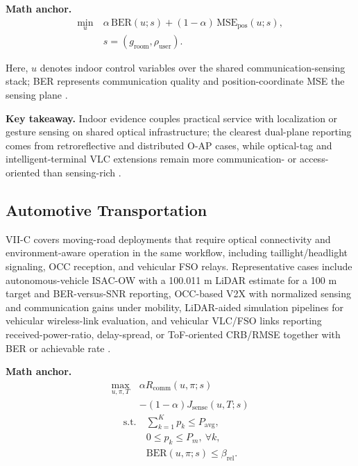 \textbf{Math anchor.}
\begin{equation}
    \begin{split}
        \min_{u}\  & \alpha\,\mathrm{BER}(u;s) + (1-\alpha)\,\mathrm{MSE}_{\mathrm{pos}}(u;s), \\
                   & s=(g_{\mathrm{room}},\rho_{\mathrm{user}}).
    \end{split}
\end{equation}

Here, $u$ denotes indoor control variables over the shared communication-sensing stack; BER represents communication quality and position-coordinate MSE the sensing plane \cite{O_ISAC_108,O_ISAC_388}.

\textbf{Key takeaway.} Indoor evidence couples practical service with localization or gesture sensing on shared optical infrastructure; the clearest dual-plane reporting comes from retroreflective and distributed O-AP cases, while optical-tag and intelligent-terminal VLC extensions remain more communication- or access-oriented than sensing-rich \cite{O_ISAC_291,O_ISAC_386}.

\subsection{Automotive Transportation}

VII-C covers moving-road deployments that require optical connectivity and environment-aware operation in the same workflow, including taillight/headlight signaling, OCC reception, and vehicular FSO relays. Representative cases include autonomous-vehicle ISAC-OW with a 100.011 m LiDAR estimate for a 100 m target and BER-versus-SNR reporting, OCC-based V2X with normalized sensing and communication gains under mobility, LiDAR-aided simulation pipelines for vehicular wireless-link evaluation, and vehicular VLC/FSO links reporting received-power-ratio, delay-spread, or ToF-oriented CRB/RMSE together with BER or achievable rate \cite{O_ISAC_003,O_ISAC_055,O_ISAC_060,O_ISAC_109,O_ISAC_164}.

\textbf{Math anchor.}
\begin{equation}
    \begin{split}
        \max_{u,\pi,T}\  & \alpha R_{\mathrm{comm}}(u,\pi;s)    \\
                         & -(1-\alpha)J_{\mathrm{sense}}(u,T;s)
    \end{split}
\end{equation}
\begin{equation}
    \begin{split}
        \text{s.t.}\  & \sum_{k=1}^{K} p_k \le P_{\mathrm{avg}},       \\
                      & 0 \le p_k \le P_m,\ \forall k,                 \\
                      & \mathrm{BER}(u,\pi;s)\le \beta_{\mathrm{rel}}.
    \end{split}
\end{equation}

